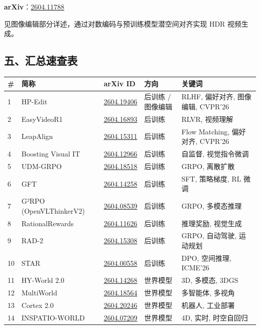 \textbf{arXiv}：\href{https://arxiv.org/abs/2604.11788}{2604.11788}

见图像编辑部分详述，通过对数编码与预训练模型潜空间对齐实现 HDR 视频生成。

\subsection{五、汇总速查表}

\small
\begin{longtable}{p{0.7cm}p{2.5cm}p{2.6cm}p{2.3cm}p{5.0cm}}
\toprule
\# & 简称 & arXiv ID & 方向 & 关键词 \\
\midrule
1 & HP-Edit & \href{https://arxiv.org/abs/2604.19406}{2604.19406} & 后训练 / 图像编辑 & RLHF, 偏好对齐, 图像编辑, CVPR'26 \\
2 & EasyVideoR1 & \href{https://arxiv.org/abs/2604.16893}{2604.16893} & 后训练 & RLVR, 视频理解 \\
3 & LeapAlign & \href{https://arxiv.org/abs/2604.15311}{2604.15311} & 后训练 & Flow Matching, 偏好对齐, CVPR'26 \\
4 & Boosting Visual IT & \href{https://arxiv.org/abs/2604.12966}{2604.12966} & 后训练 & 自监督, 视觉指令微调 \\
5 & UDM-GRPO & \href{https://arxiv.org/abs/2604.18518}{2604.18518} & 后训练 & GRPO, 离散扩散 \\
6 & GFT & \href{https://arxiv.org/abs/2604.14258}{2604.14258} & 后训练 & SFT, 策略梯度, RL 微调 \\
7 & G²RPO (OpenVLThinkerV2) & \href{https://arxiv.org/abs/2604.08539}{2604.08539} & 后训练 & GRPO, 多模态推理 \\
8 & RationalRewards & \href{https://arxiv.org/abs/2604.11626}{2604.11626} & 后训练 & 推理奖励, 视觉生成 \\
9 & RAD-2 & \href{https://arxiv.org/abs/2604.15308}{2604.15308} & 后训练 & GRPO, 自动驾驶, 运动规划 \\
10 & STAR & \href{https://arxiv.org/abs/2604.00558}{2604.00558} & 后训练 & DPO, 空间推理, ICME'26 \\
11 & HY-World 2.0 & \href{https://arxiv.org/abs/2604.14268}{2604.14268} & 世界模型 & 3D, 多模态, 3DGS \\
12 & MultiWorld & \href{https://arxiv.org/abs/2604.18564}{2604.18564} & 世界模型 & 多智能体, 多视角 \\
13 & Cortex 2.0 & \href{https://arxiv.org/abs/2604.20246}{2604.20246} & 世界模型 & 机器人, 工业部署 \\
14 & INSPATIO-WORLD & \href{https://arxiv.org/abs/2604.07209}{2604.07209} & 世界模型 & 4D, 实时, 时空自回归 \\

\end{longtable}
